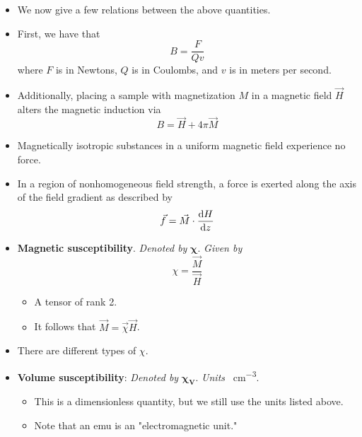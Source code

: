 \documentclass[../notes.tex]{subfiles}
\begin{document}
\begin{itemize}
\begin{itemize}
\begin{itemize}
            \item An MRI is about \SIrange{1.3}{3}{\tesla}.
        \end{itemize}
    \end{itemize}
    \item We now give a few relations between the above quantities.
    \item First, we have that
    \begin{equation*}
        B = \frac{F}{Qv}
    \end{equation*}
    where $F$ is in Newtons, $Q$ is in Coulombs, and $v$ is in meters per second.
    \item Additionally, placing a sample with magnetization $M$ in a magnetic field $\vec{H}$ alters the magnetic induction via
    \begin{equation*}
        B = \vec{H}+4\pi\vec{M}
    \end{equation*}
    \item Magnetically isotropic substances in a uniform magnetic field experience no force.
    \item In a region of nonhomogeneous field strength, a force is exerted along the axis of the field gradient as described by
    \begin{equation*}
        \vec{f} = \vec{M}\cdot\dv{H}{z}
    \end{equation*}
    \item \textbf{Magnetic susceptibility}. \emph{Denoted by} $\bm{\chi}$. \emph{Given by}
    \begin{equation*}
        \chi = \frac{\vec{M}}{\vec{H}}
    \end{equation*}
    \begin{itemize}
        \item A tensor of rank 2.
        \item It follows that $\vec{M}=\vec{\chi}\vec{H}$.
    \end{itemize}
    \item There are different types of $\chi$.
    \item \textbf{Volume susceptibility}: \emph{Denoted by} $\bm{\chi_V}$. \emph{Units} \si{\electromagneticunit\per\cubic\centi\meter}.
    \begin{itemize}
        \item This is a dimensionless quantity, but we still use the units listed above.
        \item Note that an emu is an "electromagnetic unit."
    \end{itemize}

\end{itemize}
\end{document}
